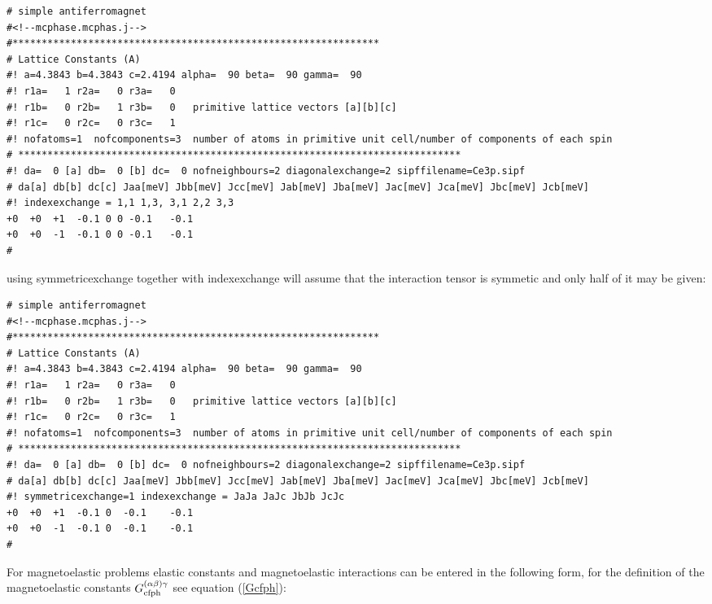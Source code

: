 {\small
\begin{verbatim} 
# simple antiferromagnet 
#<!--mcphase.mcphas.j-->
#***************************************************************
# Lattice Constants (A)
#! a=4.3843 b=4.3843 c=2.4194 alpha=  90 beta=  90 gamma=  90
#! r1a=   1 r2a=   0 r3a=   0
#! r1b=   0 r2b=   1 r3b=   0   primitive lattice vectors [a][b][c]
#! r1c=   0 r2c=   0 r3c=   1
#! nofatoms=1  nofcomponents=3  number of atoms in primitive unit cell/number of components of each spin
# ****************************************************************************
#! da=  0 [a] db=  0 [b] dc=  0 nofneighbours=2 diagonalexchange=2 sipffilename=Ce3p.sipf
# da[a] db[b] dc[c] Jaa[meV] Jbb[meV] Jcc[meV] Jab[meV] Jba[meV] Jac[meV] Jca[meV] Jbc[meV] Jcb[meV]
#! indexexchange = 1,1 1,3, 3,1 2,2 3,3
+0	+0	+1	-0.1 0 0 -0.1	-0.1  
+0	+0	-1	-0.1 0 0 -0.1	-0.1  
#\end{verbatim}
}


using symmetricexchange together with indexexchange will assume that the interaction tensor is symmetic and 
only half of it may be given:

{\small
\begin{verbatim} 
# simple antiferromagnet 
#<!--mcphase.mcphas.j-->
#***************************************************************
# Lattice Constants (A)
#! a=4.3843 b=4.3843 c=2.4194 alpha=  90 beta=  90 gamma=  90
#! r1a=   1 r2a=   0 r3a=   0
#! r1b=   0 r2b=   1 r3b=   0   primitive lattice vectors [a][b][c]
#! r1c=   0 r2c=   0 r3c=   1
#! nofatoms=1  nofcomponents=3  number of atoms in primitive unit cell/number of components of each spin
# ****************************************************************************
#! da=  0 [a] db=  0 [b] dc=  0 nofneighbours=2 diagonalexchange=2 sipffilename=Ce3p.sipf
# da[a] db[b] dc[c] Jaa[meV] Jbb[meV] Jcc[meV] Jab[meV] Jba[meV] Jac[meV] Jca[meV] Jbc[meV] Jcb[meV]
#! symmetricexchange=1 indexexchange = JaJa JaJc JbJb JcJc
+0	+0	+1	-0.1 0  -0.1	-0.1  
+0	+0	-1	-0.1 0  -0.1	-0.1  
#\end{verbatim}
}

For magnetoelastic problems elastic constants and  magnetoelastic interactions  can be entered in the following form,
for the definition of the magnetoelastic constants $G_{\rm cfph}^{(\alpha\beta)\gamma}$
see equation (\ref{Gcfph}):

